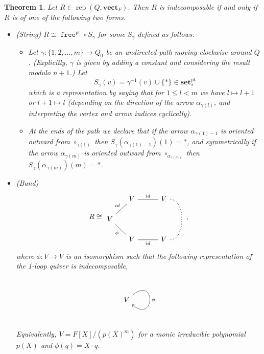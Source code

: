 \documentclass[a4paper]{amsart}
\theoremstyle{plain}
\newtheorem{theorem}{Theorem}[section]
\theoremstyle{definition}
\theoremstyle{remark}
\newcommand{\funct}[1]{\operatorname{\mathtt{#1}}}
\newcommand{\pset}{\mathbf{set}^\mathrm{pt}}
\newcommand{\vectF}{\mathbf{vect}_F}
\DeclareMathOperator{\rep}{rep}
\begin{document}
\begin{theorem} \label{thm:reps_of_Atilde}
Let $R \in \rep(Q, \vectF)$. Then $R$ is indecomposable if and only if $R$ is of one of the following two forms.  
\begin{itemize}
\item (String) $R\cong \funct{free}^\mathrm{pt} \circ S_\gamma$ for some $S_\gamma$ defined as follows. 

\begin{itemize}
\item 
Let $\gamma\colon \{1, 2, \ldots, m\}\to Q_0$ be an undirected path moving clockwise around $Q$. (Explicitly, \( \gamma \) is given by adding a constant and considering the result modulo \( n+1 \).) Let 
\[ S_\gamma(v) =  \gamma^{-1}(v) \cup \{ * \} \in \pset_* \]
which is a representation by saying that for $1\leq l<m$ we have $l \mapsto l+1$ or $l+1 \mapsto l$ (depending on the direction of the arrow $\alpha_{\gamma(l)}$, and interpreting the vertex and arrow indices cyclically).

\item
At the ends of the path we declare that if the arrow \( \alpha_{\gamma(1)-1} \) is oriented outward from \( \circ_{{\gamma(1)}}\) then \( S_\gamma(\alpha_{\gamma(1)-1})(1) = * \), and symmetrically if the arrow \( \alpha_{\gamma(m)} \) is oriented outward from \( \circ_{\alpha_{\gamma(m)}}\) then \( S_\gamma(\alpha_{\gamma(m)})(m) = * \).
\end{itemize}

\item (Band) \[R \cong \begin{tikzcd}[sep=5mm]
  & V \ar[rr,-,"{\rm id}"] && V \ar [dd,-,dotted,very thick,bend left=90] \\
  V \ar[ru,-,"{\rm id}"] \ar[rd,-,swap,"\phi"] \\
  & V \ar[rr,-,swap,"{\rm id}"] && V
  \end{tikzcd}, \]
where $\phi\colon V \to V$ is an isomorphism such that the following representation of the 1-loop quiver is indecomposable,
\[
\begin{tikzcd}
V \arrow[out=40,in=-40,loop,"\phi"]
\end{tikzcd}
\]
Equivalently, $V=F[X]/(p(X)^m)$ for a monic irreducible polynomial $p(X)$ and $\phi(q) = X\cdot q$. 
\end{itemize}
\end{theorem}
\end{document}

